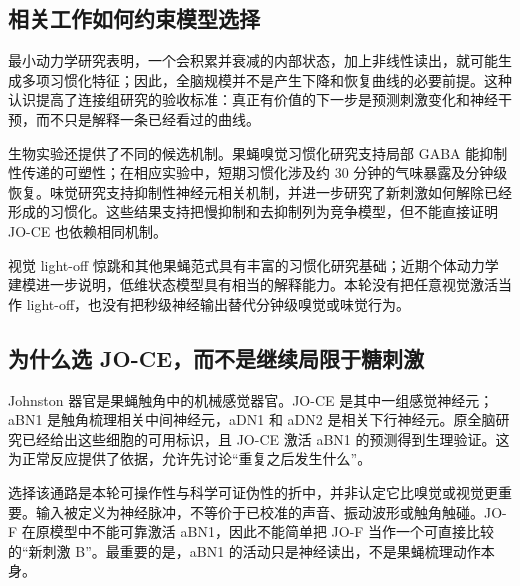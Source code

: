 \subsection{相关工作如何约束模型选择}
最小动力学研究表明，一个会积累并衰减的内部状态，加上非线性读出，就可能生成多项习惯化特征；因此，全脑规模并不是产生下降和恢复曲线的必要前提\citep{smart2024}。这种认识提高了连接组研究的验收标准：真正有价值的下一步是预测刺激变化和神经干预，而不只是解释一条已经看过的曲线。

生物实验还提供了不同的候选机制。果蝇嗅觉习惯化研究支持局部 GABA 能抑制性传递的可塑性；在相应实验中，短期习惯化涉及约 30 分钟的气味暴露及分钟级恢复\citep{das2011}。味觉研究支持抑制性神经元相关机制，并进一步研究了新刺激如何解除已经形成的习惯化\citep{paranjpe2012,trisal2022}。这些结果支持把慢抑制和去抑制列为竞争模型，但不能直接证明 JO-CE 也依赖相同机制。

视觉 light-off 惊跳和其他果蝇范式具有丰富的习惯化研究基础\citep{engel2009}；近期个体动力学建模进一步说明，低维状态模型具有相当的解释能力\citep{boon2026}。本轮没有把任意视觉激活当作 light-off，也没有把秒级神经输出替代分钟级嗅觉或味觉行为。

\subsection{为什么选 JO-CE，而不是继续局限于糖刺激}
Johnston 器官是果蝇触角中的机械感觉器官。JO-CE 是其中一组感觉神经元；aBN1 是触角梳理相关中间神经元，aDN1 和 aDN2 是相关下行神经元。原全脑研究已经给出这些细胞的可用标识，且 JO-CE 激活 aBN1 的预测得到生理验证\citep{shiu2024}。这为正常反应提供了依据，允许先讨论“重复之后发生什么”。

选择该通路是本轮可操作性与科学可证伪性的折中，并非认定它比嗅觉或视觉更重要。输入被定义为神经脉冲，不等价于已校准的声音、振动波形或触角触碰。JO-F 在原模型中不能可靠激活 aBN1，因此不能简单把 JO-F 当作一个可直接比较的“新刺激 B”。最重要的是，aBN1 的活动只是神经读出，不是果蝇梳理动作本身。

